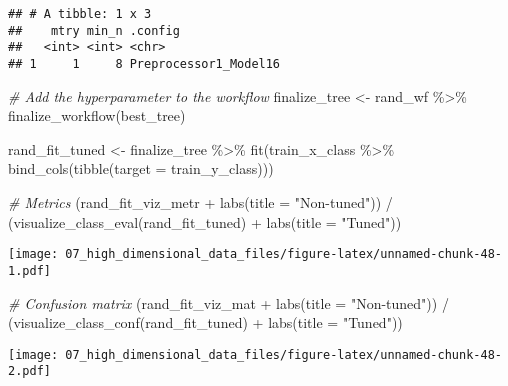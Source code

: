 \documentclass[
]{book}
\newenvironment{Shaded}{\begin{snugshade}}{\end{snugshade}}
\newcommand{\AttributeTok}[1]{\textcolor[rgb]{0.77,0.63,0.00}{#1}}
\newcommand{\CommentTok}[1]{\textcolor[rgb]{0.56,0.35,0.01}{\textit{#1}}}
\newcommand{\FunctionTok}[1]{\textcolor[rgb]{0.00,0.00,0.00}{#1}}
\newcommand{\NormalTok}[1]{#1}
\newcommand{\OtherTok}[1]{\textcolor[rgb]{0.56,0.35,0.01}{#1}}
\newcommand{\SpecialCharTok}[1]{\textcolor[rgb]{0.00,0.00,0.00}{#1}}
\newcommand{\StringTok}[1]{\textcolor[rgb]{0.31,0.60,0.02}{#1}}
\begin{document}
\begin{verbatim}
## # A tibble: 1 x 3
##    mtry min_n .config              
##   <int> <int> <chr>                
## 1     1     8 Preprocessor1_Model16
\end{verbatim}

\begin{Shaded}
\begin{Highlighting}[]
\CommentTok{\# Add the hyperparameter to the workflow }
\NormalTok{finalize\_tree }\OtherTok{\textless{}{-}}\NormalTok{ rand\_wf }\SpecialCharTok{\%\textgreater{}\%}
  \FunctionTok{finalize\_workflow}\NormalTok{(best\_tree)}
\end{Highlighting}
\end{Shaded}

\begin{Shaded}
\begin{Highlighting}[]
\NormalTok{rand\_fit\_tuned }\OtherTok{\textless{}{-}}\NormalTok{ finalize\_tree }\SpecialCharTok{\%\textgreater{}\%} 
  \FunctionTok{fit}\NormalTok{(train\_x\_class }\SpecialCharTok{\%\textgreater{}\%} \FunctionTok{bind\_cols}\NormalTok{(}\FunctionTok{tibble}\NormalTok{(}\AttributeTok{target =}\NormalTok{ train\_y\_class)))}

\CommentTok{\# Metrics }
\NormalTok{(rand\_fit\_viz\_metr }\SpecialCharTok{+} \FunctionTok{labs}\NormalTok{(}\AttributeTok{title =} \StringTok{"Non{-}tuned"}\NormalTok{)) }\SpecialCharTok{/}\NormalTok{ (}\FunctionTok{visualize\_class\_eval}\NormalTok{(rand\_fit\_tuned) }\SpecialCharTok{+} \FunctionTok{labs}\NormalTok{(}\AttributeTok{title =} \StringTok{"Tuned"}\NormalTok{))}
\end{Highlighting}
\end{Shaded}

\texttt{[image: 07\_high\_dimensional\_data\_files/figure-latex/unnamed-chunk-48-1.pdf]}

\begin{Shaded}
\begin{Highlighting}[]
\CommentTok{\# Confusion matrix }
\NormalTok{(rand\_fit\_viz\_mat }\SpecialCharTok{+} \FunctionTok{labs}\NormalTok{(}\AttributeTok{title =} \StringTok{"Non{-}tuned"}\NormalTok{)) }\SpecialCharTok{/}\NormalTok{ (}\FunctionTok{visualize\_class\_conf}\NormalTok{(rand\_fit\_tuned) }\SpecialCharTok{+} \FunctionTok{labs}\NormalTok{(}\AttributeTok{title =} \StringTok{"Tuned"}\NormalTok{))}
\end{Highlighting}
\end{Shaded}

\texttt{[image: 07\_high\_dimensional\_data\_files/figure-latex/unnamed-chunk-48-2.pdf]}
\end{document}

